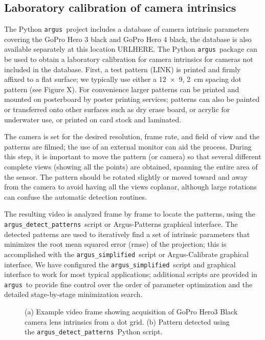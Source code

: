 \documentclass[fleqn,10pt]{wlpeerj}
\newcommand{\argus}{\texttt{argus}}
\newcommand{\detectpatterns}{\texttt{argus\_detect\_patterns}}
\newcommand{\simplified}{\texttt{argus\_simplified}}
\begin{document}
\subsection*{Laboratory calibration of camera intrinsics}
The Python \argus\ project includes a database of camera intrinsic parameters covering the GoPro Hero 3 black and GoPro Hero 4 black, the database is also available separately at this location URLHERE. The Python \argus\ package can be used to obtain a laboratory calibration for camera intrinsics for cameras not included in the database. First, a test pattern (LINK) is printed and firmly affixed to a flat surface; we typically use either a \num{12 x 9}, \SI{2}{\centi\meter} spacing dot pattern (see Figure X). For convenience larger patterns can be printed and mounted on posterboard by poster printing services; patterns can also be painted or transferred onto other surfaces such as dry erase board, or acrylic for underwater use, or printed on card stock and laminated.  

The camera is set for the desired resolution, frame rate, and field of view and the patterns are filmed; the use of an external monitor can aid the process.  During this step, it is important to move the pattern (or camera) so that several different complete views (showing all the points) are obtained, spanning the entire area of the sensor. The pattern should be rotated slightly or moved toward and away from the camera to avoid having all the views coplanar, although large rotations can confuse the automatic detection routines. 

The resulting video is analyzed frame by frame to locate the patterns, using the \detectpatterns\ script or Argus-Patterns graphical interface.  The detected patterns are used to iteratively find a set of intrinsic parameters that minimizes the root mean squared error (rmse) of the projection; this is accomplished with the \simplified\ script or Argus-Calibrate graphical interface.  We have configured the \simplified\ script and graphical interface to work for most typical applications; additional scripts are provided in \argus\ to provide fine control over the order of parameter optimization and the detailed stage-by-stage minimization search.

\begin{figure}
\caption{(a) Example video frame showing acquisition of GoPro Hero3 Black camera lens intrinsics from a dot grid.  (b) Pattern detected using the \detectpatterns\ Python script.}
\label{fig:labcal1}
\end{figure}
\end{document}
